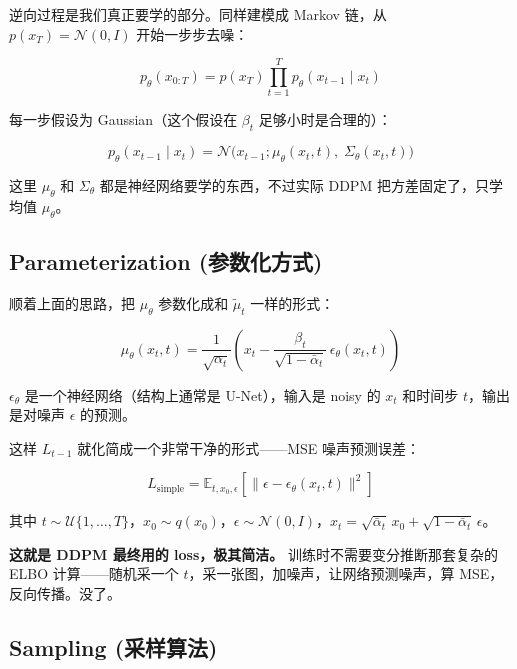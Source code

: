 \documentclass[11pt,a4paper]{article}
\theoremstyle{definition}
\newcommand{\E}{\mathbb{E}}
\newcommand{\N}{\mathcal{N}}          %
\newcommand{\Unif}{\mathcal{U}}       %
\newcommand{\alphat}{\bar{\alpha}_t}
\begin{document}
逆向过程是我们真正要学的部分。同样建模成 Markov 链，从 $p(x_T) = \N(0, I)$ 开始一步步去噪：

\begin{equation}\label{eq:ddpm_reverse}
    p_\theta(x_{0:T}) = p(x_T) \prod_{t=1}^{T} p_\theta(x_{t-1} \mid x_t)
\end{equation}

每一步假设为 Gaussian（这个假设在 $\beta_t$ 足够小时是合理的）：

\begin{equation}\label{eq:ddpm_reverse_step}
    p_\theta(x_{t-1} \mid x_t) = \N\!\big(x_{t-1}; \mu_\theta(x_t, t),\; \Sigma_\theta(x_t, t) \big)
\end{equation}

这里 $\mu_\theta$ 和 $\Sigma_\theta$ 都是神经网络要学的东西，不过实际 DDPM 把方差固定了，只学均值 $\mu_\theta$。



\subsection{Parameterization (参数化方式)}

顺着上面的思路，把 $\mu_\theta$ 参数化成和 $\tilde{\mu}_t$ 一样的形式：

\begin{equation}\label{eq:ddpm_mu_theta}
    \mu_\theta(x_t, t) = \frac{1}{\sqrt{\alpha_t}}\!\left( x_t - \frac{\beta_t}{\sqrt{1 - \alphat}}\, \epsilon_\theta(x_t, t) \right)
\end{equation}

$\epsilon_\theta$ 是一个神经网络（结构上通常是 U-Net），输入是 noisy 的 $x_t$ 和时间步 $t$，输出是对噪声 $\epsilon$ 的预测。

\smallskip
这样 $L_{t-1}$ 就化简成一个非常干净的形式——MSE 噪声预测误差：

\begin{equation}\label{eq:ddpm_simple_loss}
    L_{\text{simple}} = \E_{t, x_0, \epsilon}\!\left[ \big\| \epsilon - \epsilon_\theta(x_t, t) \big\|^2 \right]
\end{equation}

其中 $t \sim \Unif\{1, \dots, T\}$，$x_0 \sim q(x_0)$，$\epsilon \sim \N(0, I)$，$x_t = \sqrt{\alphat}\, x_0 + \sqrt{1 - \alphat}\, \epsilon$。

\textbf{这就是 DDPM 最终用的 loss，极其简洁。} 训练时不需要变分推断那套复杂的 ELBO 计算——随机采一个 $t$，采一张图，加噪声，让网络预测噪声，算 MSE，反向传播。没了。

\subsection{Sampling (采样算法)}
\end{document}
